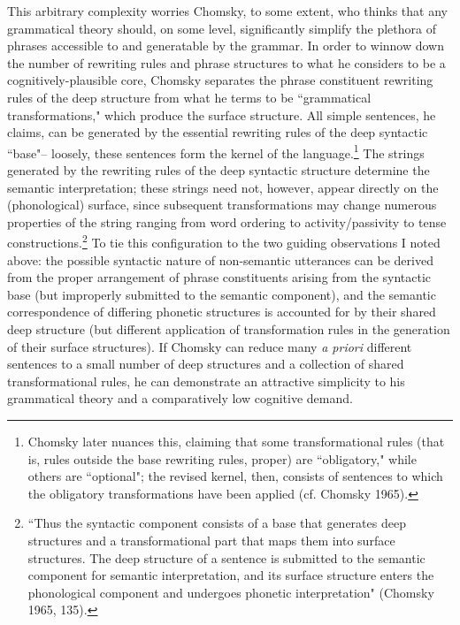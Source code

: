This arbitrary complexity worries Chomsky, to some extent, who thinks that any grammatical theory should, on some level, significantly simplify the plethora of phrases accessible to and generatable by the grammar.  In order to winnow down the number of rewriting rules and phrase structures to what he considers to be a cognitively-plausible core, Chomsky separates the phrase constituent rewriting rules of the deep structure from what he terms to be ``grammatical transformations," which produce the surface structure.  All simple sentences, he claims, can be generated by the essential rewriting rules of the deep syntactic ``base"-- loosely, these sentences form the kernel of the language.\footnote{Chomsky later nuances this, claiming that some transformational rules (that is, rules outside the base rewriting rules, proper) are ``obligatory," while others are ``optional"; the revised kernel, then, consists of sentences to which the obligatory transformations have been applied (cf. Chomsky 1965).}  The strings generated by the rewriting rules of the deep syntactic structure determine the semantic interpretation; these strings need not, however, appear directly on the (phonological) surface, since subsequent transformations may change numerous properties of the string ranging from word ordering to activity/passivity to tense constructions.\footnote{``Thus the syntactic component consists of a base that generates deep structures and a transformational part that maps them into surface structures.  The deep structure of a sentence is submitted to the semantic component for semantic interpretation, and its surface structure enters the phonological component and undergoes phonetic interpretation" (Chomsky 1965, 135).}  To tie this configuration to the two guiding observations I noted above: the possible syntactic nature of non-semantic utterances can be derived from the proper arrangement of phrase constituents arising from the syntactic base (but improperly submitted to the semantic component), and the semantic correspondence of differing phonetic structures is accounted for by their shared deep structure (but different application of transformation rules in the generation of their surface structures).  If Chomsky can reduce many \emph{a priori} different sentences to a small number of deep structures and a collection of shared transformational rules, he can demonstrate an attractive simplicity to his grammatical theory and a comparatively low cognitive demand.

